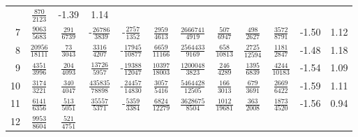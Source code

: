 \documentclass[letterpaper,11pt,nointlimits,reqno,draft]{amsbook}
\begin{document}
\begin{table}
\begin{tabular}{r|ccccccccc|c@{ -- }c@{\%}}
&  $\frac{             870}{            2123}$
&  -1.39 &  1.14
\\
7
&  $\frac{            9063}{            5683}$
&  $\frac{             291}{            6739}$
& -$\frac{           26786}{            3839}$
& -$\frac{            2757}{            1352}$
&  $\frac{            2959}{            4613}$
&  $\frac{         2666741}{            4919}$
&  $\frac{             507}{            6947}$
&  $\frac{             498}{            2627}$
&  $\frac{            3572}{            8791}$
&  -1.50 &  1.12
\\
8
&  $\frac{           20956}{           18111}$
&  $\frac{              73}{            3043}$
&  $\frac{            3316}{            4207}$
& -$\frac{           17945}{           10877}$
&  $\frac{            6659}{           11166}$
&  $\frac{         2564433}{            9169}$
&  $\frac{             658}{           10813}$
&  $\frac{            2725}{           12594}$
&  $\frac{            1181}{            2847}$
&  -1.48 &  1.18
\\
9
&  $\frac{            4351}{            3996}$
&  $\frac{             204}{            4093}$
&  $\frac{           13726}{            5957}$
& -$\frac{           19388}{           12047}$
&  $\frac{           10397}{           18003}$
&  $\frac{         1200048}{            3823}$
&  $\frac{             246}{            4289}$
&  $\frac{            1395}{            6839}$
&  $\frac{            4244}{           10183}$
&  -1.54 &  1.09
\\
10
&  $\frac{            3174}{            3221}$
&  $\frac{             340}{            4047}$
&  $\frac{          435835}{           78898}$
& -$\frac{           24457}{           14830}$
&  $\frac{            3057}{            5416}$
&  $\frac{         5464428}{           12505}$
&  $\frac{             166}{            3013}$
&  $\frac{             679}{            3691}$
&  $\frac{            2669}{            6422}$
&  -1.59 &  1.11
\\
11
&  $\frac{            6141}{            6356}$
&  $\frac{             513}{            5051}$
&  $\frac{           35557}{            5371}$
& -$\frac{            5359}{            3384}$
&  $\frac{            6824}{           12279}$
&  $\frac{         3628675}{            8504}$
&  $\frac{            1012}{           19681}$
&  $\frac{             363}{            2008}$
&  $\frac{            1873}{            4520}$
&  -1.56 &  0.94
\\
12
&  $\frac{            9953}{            8604}$
&  $\frac{             521}{            4751}$

\end{tabular}
\end{table}
\end{document}
